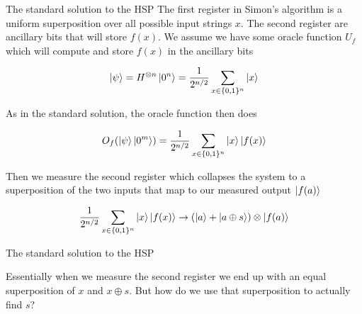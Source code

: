 \documentclass[aspectratio=1610]{beamer}					%
\begin{document}
\begin{frame}{The standard solution to the HSP}
The first register in Simon's algorithm is a uniform superposition over all possible input strings $x$. The second register are ancillary bits that will store $f(x)$. We assume we have some oracle function $U_{f}$ which will compute and store $f(x)$ in the ancillary bits

\begin{equation*}
\ket{\psi} = H^{\otimes n}\ket{0^{n}} = \frac{1}{2^{n/2}}\sum_{x\in\{0,1\}^{n}}\ket{x}
\end{equation*}

As in the standard solution, the oracle function then does

\begin{equation*}
O_{f}(\ket{\psi}\ket{0^{m}}) = \frac{1}{2^{n/2}}\sum_{x\in\{0,1\}^{n}}\ket{x}\ket{f(x)}
\end{equation*}

Then we measure the second register which collapses the system to a superposition of the two inputs that map to our measured output $\ket{f(a)}$

\begin{equation*}
\frac{1}{2^{n/2}}\sum_{x\in\{0,1\}^{n}}\ket{x}\ket{f(x)} \rightarrow \left(\ket{a}+\ket{a\oplus s}\right)\otimes \ket{f(a)}
\end{equation*}

\end{frame}

\begin{frame}{The standard solution to the HSP}

Essentially when we measure the second register we end up with an equal superposition of $x$ and $x\oplus s$. But how do we use that superposition to actually find $s$?

\end{frame}
\end{document}
